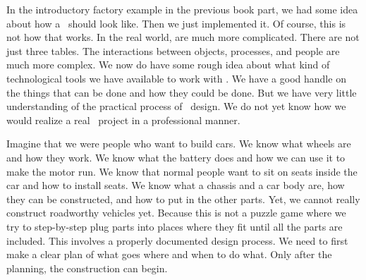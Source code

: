 %
%
In the introductory factory example in the previous book part, we had some idea about how a \db\ should look like.
Then we just implemented it.
Of course, this is not how that works.
In the real world,  are much more complicated.
There are not just three tables.
The interactions between objects, processes, and people are much more complex.
We now do have some rough idea about what kind of technological tools we have available to work with .
We have a good handle on the things that can be done and how they could be done.
But we have very little understanding of the practical process of \db\ design.
We do not yet know how we would realize a real \db\ project in a professional manner.

Imagine that we were people who want to build cars.
We know what wheels are and how they work.
We know what the battery does and how we can use it to make the motor run.
We know that normal people want to sit on seats inside the car and how to install seats.
We know what a chassis and a car body are, how they can be constructed, and how to put in the other parts.
Yet, we cannot really construct roadworthy vehicles yet.
Because this is not a puzzle game where we try to step-by-step plug parts into places where they fit until all the parts are included.
This involves a properly documented design process.
We need to first make a clear plan of what goes where and when to do what.
Only after the planning, the construction can begin.

